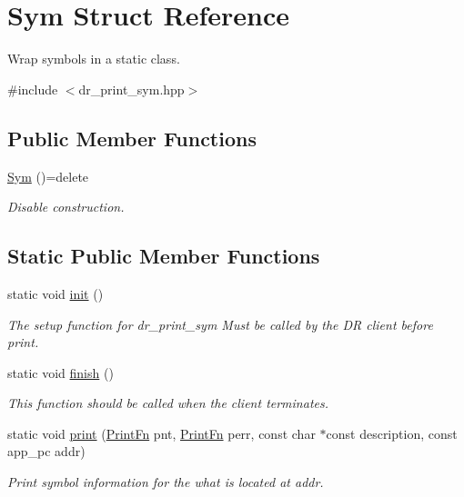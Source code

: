 \hypertarget{struct_sym}{}\section{Sym Struct Reference}
\label{struct_sym}


Wrap symbols in a static class.  




{\ttfamily \#include $<$dr\+\_\+print\+\_\+sym.\+hpp$>$}

\subsection*{Public Member Functions}
\begin{DoxyCompactItemize}
\item 
\hyperlink{struct_sym_aa2c1e0336fc028030e91c380230a0ae3}{Sym} ()=delete
\begin{DoxyCompactList}\small\item\em Disable construction. \end{DoxyCompactList}\end{DoxyCompactItemize}
\subsection*{Static Public Member Functions}
\begin{DoxyCompactItemize}
\item 
static void \hyperlink{struct_sym_aa14d1ce9dbef3383d591499714c4d164}{init} ()
\begin{DoxyCompactList}\small\item\em The setup function for dr\+\_\+print\+\_\+sym Must be called {\itshape by the DR client} before print. \end{DoxyCompactList}\item 
static void \hyperlink{struct_sym_a474eb27bfe01436357e0be478020611c}{finish} ()
\begin{DoxyCompactList}\small\item\em This function should be called when the client terminates. \end{DoxyCompactList}\item 
static void \hyperlink{struct_sym_acda3df3e55ac97cbf38459b1121b9673}{print} (\hyperlink{struct_sym_a7d4d0c72d65ffac9eb1d1eca78d58992}{Print\+Fn} pnt, \hyperlink{struct_sym_a7d4d0c72d65ffac9eb1d1eca78d58992}{Print\+Fn} perr, const char $\ast$const description, const app\+\_\+pc addr)
\begin{DoxyCompactList}\small\item\em Print symbol information for the what is located at addr. \end{DoxyCompactList}\end{DoxyCompactItemize}
